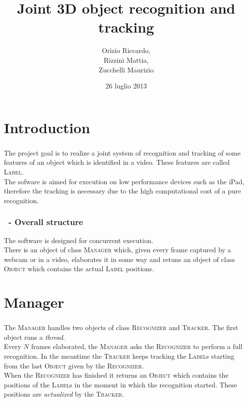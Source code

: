 \documentclass{beamer}
\title{Joint 3D object recognition and tracking}
\author[Orizio, Rizzini, Zucchelli]{Orizio Riccardo,\\Rizzini Mattia,\\Zucchelli Maurizio}
\date{26 luglio 2013}
\institute[UniBS]{Universit\`{a} degli Studi di Brescia}
\begin{document}
	\begin{frame}
		\maketitle
	\end{frame}

	\section{Introduction}
	
	\begin{frame}
		\frametitle{\insertsection}
		The project goal is to realize a joint system of recognition and tracking
		of some features of an object which is identified in a video.
		These features are called \textsc{Label}.\\
		The sofware is aimed for execution on low performance devices such as the
		iPad, therefore the tracking is necessary due to the high computational
		cost of a pure recognition.\\
	\end{frame}

	\begin{frame}
		\frametitle{\insertsection\ - Overall structure}
		The software is designed for concurrent execution.\\
		There is an object of class \textsc{Manager} which, given every frame
		captured by a webcam or in a video, elaborates it in some way and retuns
		an object of class \textsc{Object} which contains the actual \textsc{Label}
		positions.\\
	\end{frame}

	\AtBeginSection[]
	{
		\begin{frame}
			\frametitle{Outline}
			\tableofcontents[currentsection]
		\end{frame}
	}
	\section{Manager}

	\begin{frame}
		\frametitle{\insertsection}
		The \textsc{Manager} handles two objects of class \textsc{Recognizer} and
		\textsc{Tracker}. The first object runs a \emph{thread}.\\
		Every $N$ frames elaborated, the \textsc{Manager} asks the
		\textsc{Recognizer} to perform a full recognition. In the meantime the
		\textsc{Tracker} keeps tracking the \textsc{Label}s starting from the last
		\textsc{Object} given by the \textsc{Recognizer}.\\
		When the \textsc{Recognizer} has finished it returns an \textsc{Object}
		which contains the positions of the \textsc{Label}s in the moment in which
		the recognition started. These positions are \emph{actualized} by the
		\textsc{Tracker}.\\
	\end{frame}
\end{document}
